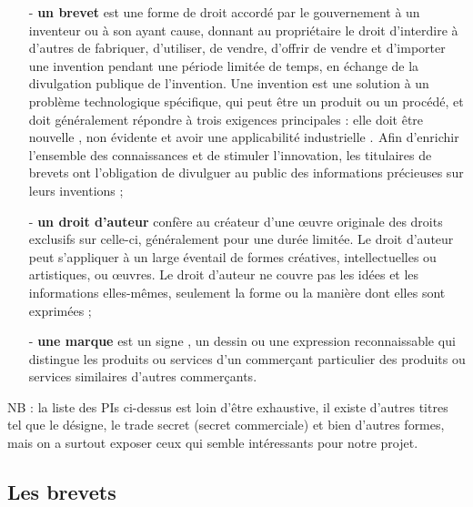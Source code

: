 \begin{enumerate}
    \item[-] \textbf{un brevet} est une forme de droit accordé par le gouvernement à un inventeur ou à son ayant cause, donnant au propriétaire le droit d'interdire à d'autres de fabriquer, d'utiliser, de vendre, d'offrir de vendre et d'importer une invention pendant une période limitée de temps, en échange de la divulgation publique de l'invention. Une invention est une solution à un problème technologique spécifique, qui peut être un produit ou un procédé, et doit généralement répondre à trois exigences principales : elle doit être nouvelle , non évidente et avoir une applicabilité industrielle .  Afin d'enrichir l'ensemble des connaissances et de stimuler l'innovation, les titulaires de brevets ont l'obligation de divulguer au public des informations précieuses sur leurs inventions ;
    
    \item[-] \textbf{un droit d'auteur} confère au créateur d'une œuvre originale des droits exclusifs sur celle-ci, généralement pour une durée limitée. Le droit d'auteur peut s'appliquer à un large éventail de formes créatives, intellectuelles ou artistiques, ou œuvres.  Le droit d'auteur ne couvre pas les idées et les informations elles-mêmes, seulement la forme ou la manière dont elles sont exprimées ;
    
    \item[-] \textbf{une marque} est un signe , un dessin ou une expression reconnaissable qui distingue les produits ou services d'un commerçant particulier des produits ou services similaires d'autres commerçants. 
\end{enumerate}

NB : la liste des PIs ci-dessus est loin d'être exhaustive,  il existe d’autres titres tel que  le désigne, le trade secret (secret commerciale) et bien d'autres formes, mais on a surtout exposer ceux qui semble intéressants pour notre projet. 


\subsection{Les brevets}
 

